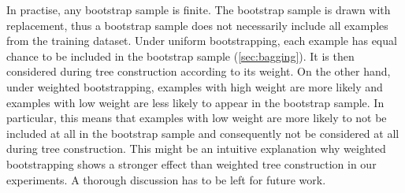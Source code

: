 \documentclass[../main.tex]{subfiles}
\begin{document}
%
%
In practise, any bootstrap sample is finite. The bootstrap sample is drawn with replacement, thus a bootstrap sample does not necessarily include all examples from the training dataset. 
%
Under uniform bootstrapping, each example has equal chance to be included in the bootstrap sample (\cf \ref{sec:bagging}). It is then considered during tree construction according to its weight. On the other hand, under weighted bootstrapping, examples with high weight are more likely and examples with low weight are less likely to appear in the bootstrap sample. In particular, this means that examples with low weight are more likely to not be included at all in the bootstrap sample and consequently not be considered at all during tree construction. 
%
This might be an intuitive explanation why weighted bootstrapping shows a stronger effect than weighted tree construction in our experiments.  A thorough discussion has to be left for future work. 


\end{document}

